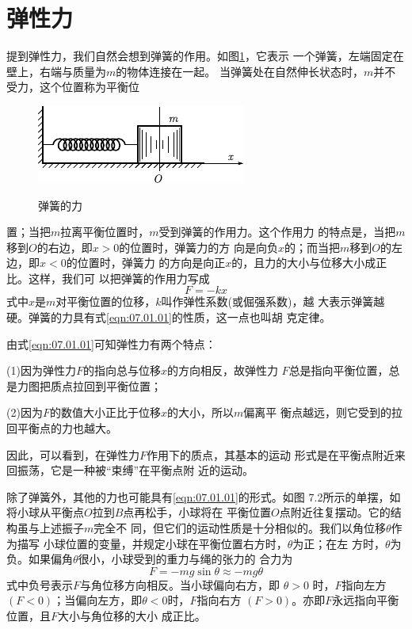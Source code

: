 \section{弹性力}\label{sec:07.01}

提到弹性力，我们自然会想到弹簧的作用。如图\ref{fig:07.01}，它表示
一个弹簧，左端固定在壁上，右端与质量为$ m $的物体连接在一起。
当弹簧处在自然伸长状态时，$ m $并不受力，这个位置称为平衡位
\begin{figure}
    \centering
    \includegraphics{figure/fig07.01}\\[1em]
    \caption{弹簧的力}
    \label{fig:07.01}
\end{figure}
置；当把$ m $拉离平衡位置时，$ m $受到弹簧的作用力。这个作用力
的特点是，当把$ m $移到$ O $的右边，即$  x > 0   $的位置时，弹簧力的方
向是向负$ x $的；而当把$ m $移到$ O $的左边，即$ x<0 $的位置时，弹簧力
的方向是向正$ x $的，且力的大小与位移大小成正比。这样，我们可
以把弹簧的作用力写成
\begin{equation}\label{eqn:07.01.01}
	F = - k x
\end{equation}
式中$ x $是$ m $对平衡位置的位移，$ k $叫作弹性系数(或倔强系数)，越
大表示弹簧越硬。弹簧的力具有式\eqref{eqn:07.01.01}的性质，这一点也叫胡
克定律。

由式\eqref{eqn:07.01.01}可知弹性力有两个特点：

(1)因为弹性力$ F $的指向总与位移$ x $的方向相反，故弹性力
$ F $总是指向平衡位置，总是力图把质点拉回到平衡位置；

(2)因为$ F $的数值大小正比于位移$ x $的大小，所以$ m $偏离平
衡点越远，则它受到的拉回平衡点的力也越大。

因此，可以看到，在弹性力$ F $作用下的质点，其基本的运动
形式是在平衡点附近来回振荡，它是一种被“束缚”在平衡点附
近的运动。

除了弹簧外，其他的力也可能具有\eqref{eqn:07.01.01}的形式。如图
7.2所示的单摆，如将小球从平衡点$ O $拉到$ B $点再松手，小球将在
平衡位置$ O $点附近往复摆动。它的结构虽与上述振子$ m $完全不
同，但它们的运动性质是十分相似的。我们以角位移$ \theta $作为描写
小球位置的变量，并规定小球在平衡位置右方时，$ \theta $为正；在左
方时，$ \theta $为负。如果偏角$ \theta $很小，小球受到的重力与绳的张力的
合力为
\begin{equation}\label{eqn:07.01.02}
	F = - m g \sin \theta \approx - m g \theta
\end{equation}
式中负号表示$ F $与角位移方向相反。当小球偏向右方，即 $ \theta > 0  $
时，$ F $指向左方$ \left( F < 0 \right) $；当偏向左方，即$  \theta < 0   $时，$ F $指向右方
$ \left( F > 0 \right) $。亦即$ F $永远指向平衡位置，且$ F $大小与角位移的大小
成正比。

